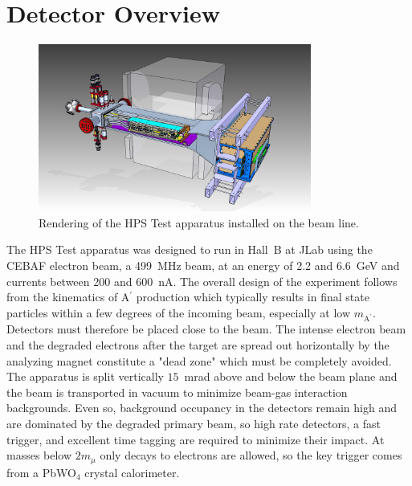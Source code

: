 \documentclass[final,3p,times,twocolumn]{elsarticle}
\newcommand{\Aprime}{A\ensuremath{^\prime}}
\begin{document}
\section{Detector Overview}
\label{detector}
\begin{center}
{\small
\begin{figure}[ht]
    \includegraphics[width=0.8\textwidth]{figures/hps_testrun_rendering}
\caption{Rendering of the HPS Test apparatus installed on the beam line.}
\label{fig:testrundetector}
\end{figure}
}
\end{center}
The HPS Test apparatus was designed to run in Hall~B at JLab using the CEBAF electron beam, a 
499~MHz beam, at an energy of 2.2 and 6.6~GeV and currents between 200 and 600~nA.  
The overall design of the experiment follows from the kinematics of \Aprime{} production which 
typically results in final state particles within a few degrees of the incoming beam, especially at low 
$m_{\textrm{A}^\prime}$. Detectors must therefore be placed close to the beam. 
The intense electron beam and the degraded electrons after the target are spread out horizontally by 
the analyzing magnet constitute a "dead zone" which must be completely avoided. The apparatus is 
split vertically $15$~mrad above and below the beam plane and the beam is transported in vacuum 
to minimize beam-gas interaction backgrounds. Even so, background occupancy in the detectors 
remain high and are dominated by the degraded primary beam, so high rate detectors, a fast trigger, 
and excellent time tagging are required to minimize their impact.  
At masses below $2 m_\mu$ only decays to electrons are allowed, so the key trigger comes from a PbWO$_{4}$ crystal calorimeter. 
\end{document}
